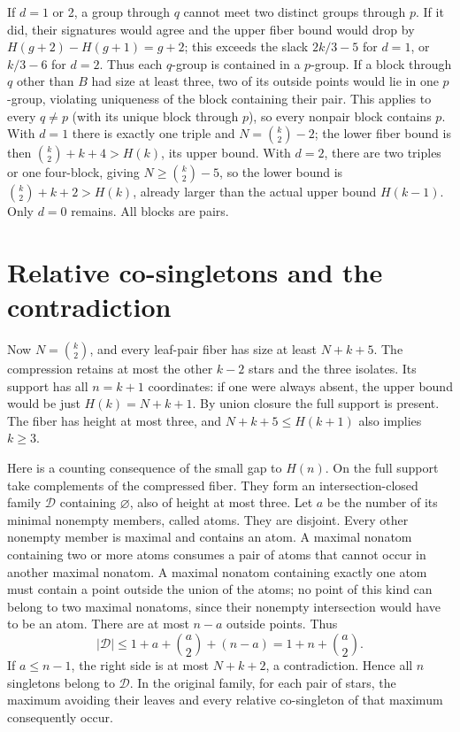 \documentclass[11pt,letterpaper]{article}
\begin{document}
If \(d=1\) or 2, a group through \(q\) cannot meet two distinct
groups through \(p\). If it did, their signatures would agree and
the upper fiber bound would drop by \(H(g+2)-H(g+1)=g+2\);
this exceeds the slack \(2k/3-5\) for \(d=1\), or \(k/3-6\)
for \(d=2\). Thus each \(q\)-group is contained in a \(p\)-group.
If a block through \(q\) other than \(B\) had size at least three,
two of its outside points would lie in one \(p\)-group, violating
uniqueness of the block containing their pair. This applies to
every \(q\ne p\) (with its unique block through \(p\)), so every
nonpair block contains \(p\). With \(d=1\) there is exactly one
triple and \(N=\binom k2-2\); the lower fiber bound is then
\(\binom k2+k+4>H(k)\), its upper bound. With \(d=2\),
there are two triples or one four-block, giving
\(N\ge\binom k2-5\), so the lower bound is
\(\binom k2+k+2>H(k)\), already larger than the actual upper
bound \(H(k-1)\). Only \(d=0\) remains. All blocks are pairs.

\section{Relative co-singletons and the contradiction}
Now \(N=\binom k2\), and every leaf-pair fiber has size at
least \(N+k+5\). The compression retains at most the other
\(k-2\) stars and the three isolates. Its support has all
\(n=k+1\) coordinates: if one were always absent, the upper
bound would be just \(H(k)=N+k+1\). By union closure the full
support is present. The fiber has height at most three, and
\(N+k+5\le H(k+1)\) also implies \(k\ge3\).

Here is a counting consequence of the small gap to \(H(n)\).
On the full support take complements of the compressed fiber.
They form an intersection-closed family \(\mathcal D\) containing
\(\varnothing\), also of height at most three. Let \(a\) be the
number of its minimal nonempty members, called atoms. They are
disjoint. Every other nonempty member is maximal and contains an
atom. A maximal nonatom containing two or more atoms consumes
a pair of atoms that cannot occur in another maximal nonatom.
A maximal nonatom containing exactly one atom must contain a
point outside the union of the atoms; no point of this kind can
belong to two maximal nonatoms, since their nonempty intersection
would have to be an atom. There are at most \(n-a\) outside
points. Thus
\[
  |\mathcal D|\le1+a+\binom a2+(n-a)=1+n+\binom a2.
\]
If \(a\le n-1\), the right side is at most \(N+k+2\), a
contradiction. Hence all \(n\) singletons belong to
\(\mathcal D\). In the original family, for each pair of stars,
the maximum avoiding their leaves and every relative co-singleton
of that maximum consequently occur.
\end{document}
